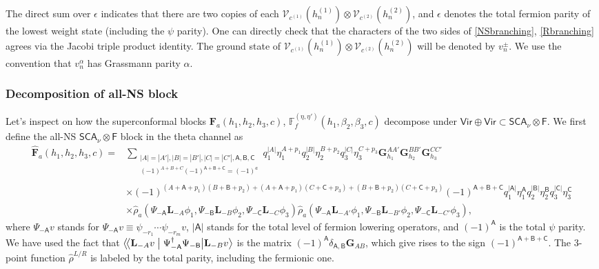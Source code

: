 \documentclass[12pt]{article}
\newcommand{\ie}{\begin{equation}\begin{aligned}}
\newcommand{\fe}{\end{aligned}\end{equation}}
\numberwithin{equation}{section}
\newcommand{\bpzbraket}[2]{%
  \bigl\langle\!\bigl\langle #1 \bigm| #2 \bigr\rangle%
}
\begin{document}
The direct sum over $\epsilon$ indicates that there are two copies of each $\mathcal{V}_{c^{(1)}}(h_{n}^{(1)}) \otimes \mathcal{V}_{c^{(2)}}(h_{n}^{(2)})$, and $\epsilon$ denotes the total fermion parity of the lowest weight state (including the $\psi$ parity). One can directly check that the characters of the two sides of \eqref{NSbranching}, \eqref{Rbranching} agrees via the Jacobi triple product identity. The ground state of $\mathcal{V}_{c^{(1)}}(h_{n}^{(1)}) \otimes \mathcal{V}_{c^{(2)}}(h_{n}^{(2)})$ will be denoted by $v^\pm_n$. We use the convention that $v^\alpha_n$ has Grassmann parity $\alpha$.

\subsubsection*{Decomposition of all-NS block}

Let's inspect on how the superconformal blocks $\mathbf{F}_a(h_1, h_2, h_3, c)$, $\mathbb{F}_f^{(\eta, \eta')}(h_1, \beta_2, \beta_3,c)$ decompose under $\mathsf{Vir}\oplus \mathsf{Vir}\subset \mathsf{SCA}_\nu \otimes \mathsf{F}$. We first define the all-NS $\mathsf{SCA}_\nu \otimes \mathsf{F}$ block in the theta channel as
\ie
\widehat{\mathbf{F}}_a(h_1, h_2, h_3, c)= & \sum_{
  \substack{
  |A|=|A'|,|B|=|B'|,|C|=|C'|,\mathsf{A}, \mathsf{B}, \mathsf{C}\\
  (-1)^{A+B+C}(-1)^{\mathsf{A}+\mathsf{B}+\mathsf{C}}=(-1)^a\\
  }
} q_1^{|A|}\eta_1^{A+p_1} q_2^{|B|} \eta_2^{B+p_2} q_3^{|C|} \eta_3^{C+p_3} \mathbf{G}_{h_1}^{AA'} \mathbf{G}_{h_2}^{BB'} \mathbf{G}_{h_3}^{CC'} \\
& \times (-1)^{(A+\mathsf{A}+p_1)(B+\mathsf{B}+p_2)+(A+\mathsf{A}+p_1)(C+\mathsf{C}+p_3)+(B+\mathsf{B}+p_2)(C+\mathsf{C}+p_3)}(-1)^{\mathsf{A}+\mathsf{B}+\mathsf{C}}q_1^{|\mathsf{A}|}\eta_1^{\mathsf{A}}q_2^{|\mathsf{B}|}\eta_2^{\mathsf{B}}q_3^{|\mathsf{C}|} \eta_3^{\mathsf{C}}\\
& \times \hat{\rho}_a(\Psi_{-\mathsf{A}}\mathbf{L}_{-A} \phi_1, \Psi_{-\mathsf{B}}\mathbf{L}_{-B} \phi_2, \Psi_{-\mathsf{C}}\mathbf{L}_{-C} \phi_3) \hat{\rho}_a(\Psi_{-\mathsf{A}}\mathbf{L}_{-A'} \phi_1, \Psi_{-\mathsf{B}}\mathbf{L}_{-B'} \phi_2, \Psi_{-\mathsf{C}}\mathbf{L}_{-C'} \phi_3) ,
\fe
where ${\Psi}_{-\mathsf{A}}v$ stands for $\Psi_{-\mathsf{A}}v \equiv \psi_{-r_1}\cdots \psi_{-r_m} v$, $|\mathsf{A}|$ stands for the total level of fermion lowering operators, and $(-1)^{\mathsf{A}}$ is the total $\psi$ parity. We have used the fact that $\bpzbraket{\mathbf{L}_{-A}v}{\Psi_{-\mathsf{A}}^\dagger \Psi_{-\mathsf{B}}\big | \mathbf{L}_{-B}v}$ is the matrix $(-1)^{\mathsf{A}}\delta_{\mathsf{A},\mathsf{B}}\mathbf{G}_{AB}$, which give rises to the sign $(-1)^{\mathsf{A}+\mathsf{B}+\mathsf{C}}$. The 3-point function $\hat{\rho}^{L/R}$ is labeled by the total parity, including the fermionic one.
\end{document}
